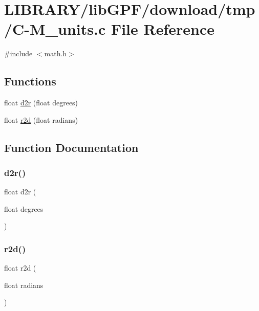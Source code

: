 \hypertarget{C-M__units_8c}{}\section{L\+I\+B\+R\+A\+R\+Y/lib\+G\+P\+F/download/tmp/\+C-\/\+M\+\_\+units.c File Reference}
\label{C-M__units_8c}
{\ttfamily \#include $<$math.\+h$>$}\newline
\subsection*{Functions}
\begin{DoxyCompactItemize}
\item 
float \hyperlink{C-M__units_8c_a4f769afe985b27d98f3114c2cb458221}{d2r} (float degrees)
\item 
float \hyperlink{C-M__units_8c_ac021a3c865860684d655b69f1a1735e8}{r2d} (float radians)
\end{DoxyCompactItemize}


\subsection{Function Documentation}
\mbox{\label{C-M__units_8c_a4f769afe985b27d98f3114c2cb458221}} 
\subsubsection{\texorpdfstring{d2r()}{d2r()}}
{\footnotesize\ttfamily float d2r (\begin{DoxyParamCaption}\item[{float}]{degrees }\end{DoxyParamCaption})}

\mbox{\label{C-M__units_8c_ac021a3c865860684d655b69f1a1735e8}} 
\subsubsection{\texorpdfstring{r2d()}{r2d()}}
{\footnotesize\ttfamily float r2d (\begin{DoxyParamCaption}\item[{float}]{radians }\end{DoxyParamCaption})}

